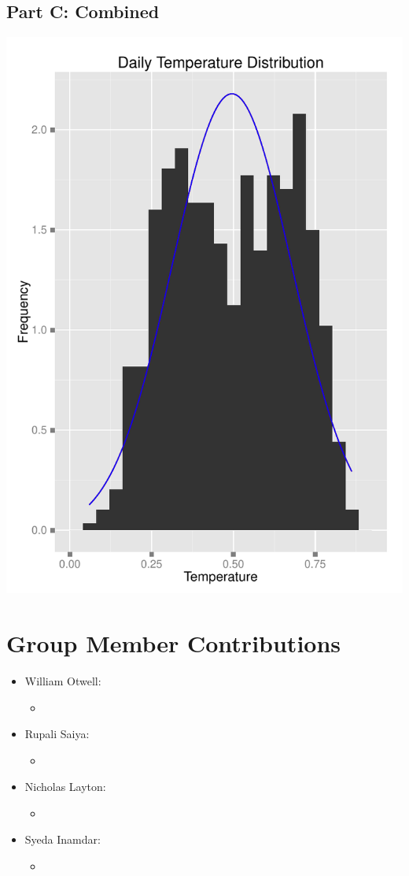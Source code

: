 \documentclass[11pt]{article}
\begin{document}
\subsection{Part C: Combined}
\label{subsesc:problem3ccombined}
\includegraphics{Problem3C.pdf}
\newline
\pagebreak

\section{Group Member Contributions}
\begin{itemize}
	\item William Otwell:
	\begin{itemize}
		\item 
	\end{itemize}
	
	\item Rupali Saiya:
	\begin{itemize}
		\item 
	\end{itemize}
	
	\item Nicholas Layton:
	\begin{itemize}
		\item 
	\end{itemize}
	
	\item Syeda Inamdar:
	\begin{itemize}
		\item 
	\end{itemize}
\end{itemize}
\pagebreak
\end{document}
